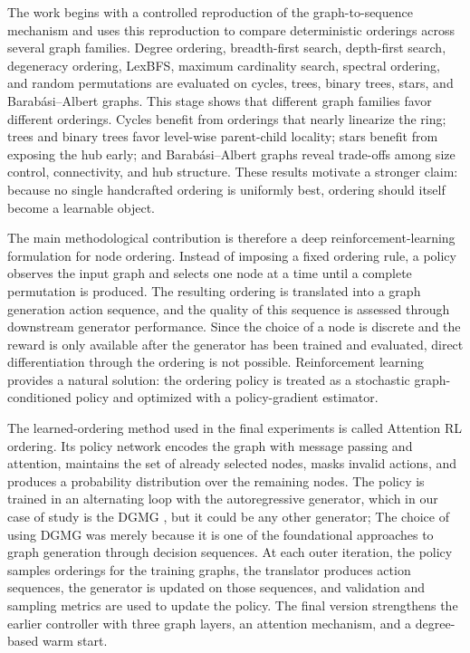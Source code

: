 The work begins with a controlled reproduction of the graph-to-sequence mechanism and uses this reproduction to compare deterministic orderings across several graph families. Degree ordering, breadth-first search, depth-first search, degeneracy ordering, LexBFS, maximum cardinality search, spectral ordering, and random permutations are evaluated on cycles, trees, binary trees, stars, and Barab\'asi--Albert graphs. This stage shows that different graph families favor different orderings. Cycles benefit from orderings that nearly linearize the ring; trees and binary trees favor level-wise parent-child locality; stars benefit from exposing the hub early; and Barab\'asi--Albert graphs reveal trade-offs among size control, connectivity, and hub structure. These results motivate a stronger claim: because no single handcrafted ordering is uniformly best, ordering should itself become a learnable object.

The main methodological contribution is therefore a deep reinforcement-learning formulation for node ordering. Instead of imposing a fixed ordering rule, a policy observes the input graph and selects one node at a time until a complete permutation is produced. The resulting ordering is translated into a graph generation action sequence, and the quality of this sequence is assessed through downstream generator performance. Since the choice of a node is discrete and the reward is only available after the generator has been trained and evaluated, direct differentiation through the ordering is not possible. Reinforcement learning provides a natural solution: the ordering policy is treated as a stochastic graph-conditioned policy and optimized with a policy-gradient estimator.

The learned-ordering method used in the final experiments is called Attention RL ordering. Its policy network encodes the graph with message passing and attention, maintains the set of already selected nodes, masks invalid actions, and produces a probability distribution over the remaining nodes. The policy is trained in an alternating loop with the autoregressive generator, which in our case of study is the DGMG \cite{li2018learning}, but it could be any other generator; The choice of using DGMG was merely because it is one of the foundational approaches to graph generation through decision sequences. At each outer iteration, the policy samples orderings for the training graphs, the translator produces action sequences, the generator is updated on those sequences, and validation and sampling metrics are used to update the policy. The final version strengthens the earlier controller with three graph layers, an attention mechanism, and a degree-based warm start.

